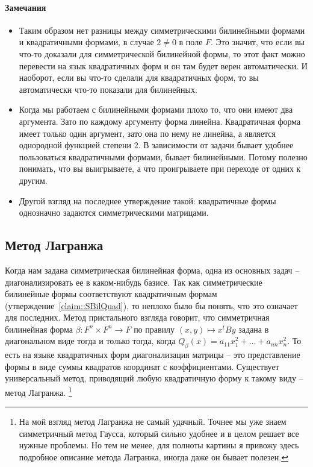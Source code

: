 \paragraph{Замечания}

\begin{itemize}
\item Таким образом нет разницы между симметрическими билинейными формами и квадратичными формами, в случае $2 \neq 0$ в поле $F$.
Это значит, что если вы что-то доказали для симметрической билинейной формы, то этот факт можно перевести на язык квадратичных форм и он там будет верен автоматически.
И наоборот, если вы что-то сделали для квадратичных форм, то вы автоматически что-то показали для билинейных.

\item Когда мы работаем с билинейными формами плохо то, что они имеют два аргумента.
Зато по каждому аргументу форма линейна.
Квадратичная форма имеет только один аргумент, зато она по нему не линейна, а является однородной функцией степени $2$.
В зависимости от задачи бывает удобнее пользоваться квадратичными формами, бывает билинейными.
Потому полезно понимать, что вы выигрываете, а что проигрываете при переходе от одних к другим.

\item Другой взгляд на последнее утверждение такой: квадратичные формы однозначно задаются симметрическими матрицами.

\end{itemize}


\subsection{Метод Лагранжа}

Когда нам задана симметрическая билинейная форма, одна из основных задач -- диагонализировать ее в каком-нибудь базисе.
Так как симметрические билинейные формы соответствуют квадратичным формам (утверждение~\ref{claim::SBilQuad}), то неплохо было бы понять, что это означает для последних.
Метод пристального взгляда говорит, что симметричная билинейная форма $\beta\colon F^n \times F^n \to F$ по правилу $(x, y)\mapsto x^t B y$ задана в диагональном виде тогда и только тогда, когда $Q_\beta(x) = a_{11}x_1^2 + \ldots + a_{nn}x_n^2$.
То есть на языке квадратичных форм диагонализация матрицы -- это представление формы в виде суммы квадратов координат с коэффициентами.
Существует универсальный метод, приводящий любую квадратичную форму к такому виду -- метод Лагранжа.%
\footnote{На мой взгляд метод Лагранжа не самый удачный.
Точнее мы уже знаем симметричный метод Гаусса, который сильно удобнее и в целом решает все нужные проблемы.
Но тем не менее, для полноты картины я привожу здесь подробное описание метода Лагранжа, иногда даже он бывает полезен.}

